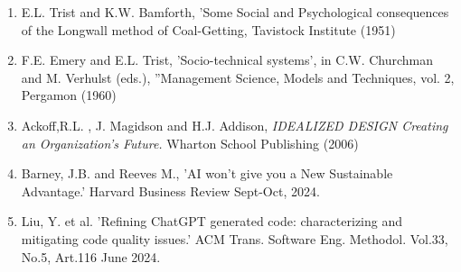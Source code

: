 \begin{enumerate}
\tightlist
\item
  E.L. Trist and K.W. Bamforth, 'Some Social and Psychological
  consequences of the Longwall method of Coal-Getting, Tavistock
  Institute (1951)
\item
  F.E. Emery and E.L. Trist, 'Socio-technical systems', in C.W.
  Churchman and M. Verhulst (eds.), ''Management Science, Models and
  Techniques, vol. 2, Pergamon (1960)
\item
  Ackoff,R.L. , J. Magidson and H.J. Addison, \emph{IDEALIZED DESIGN
  Creating an Organization's Future.} Wharton School Publishing (2006)
\item
  Barney, J.B. and Reeves M., 'AI won't give you a New Sustainable
  Advantage.' Harvard Business Review Sept-Oct, 2024.
\item
  Liu, Y. et al. 'Refining ChatGPT generated code: characterizing and
  mitigating code quality issues.' ACM Trans. Software Eng. Methodol.
  Vol.33, No.5, Art.116 June 2024.
\end{enumerate}


